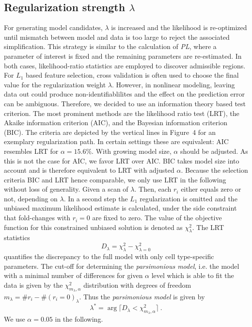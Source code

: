 \documentclass{bioinfo}
\begin{document}
\subsection{Regularization strength $\lambda$}
For generating model candidates, $\lambda$ is increased and the likelihood is re-optimized until mismatch between model and data is too large to reject the associated simplification.
This strategy is similar to the calculation of \emph{PL}, where a parameter of interest is fixed and the remaining parameters are re-estimated.
In both cases, likelihood-ratio statistics are employed to discover admissible regions.
For $L_1$ based feature selection, cross validation is often used to choose the final value for the regularization weight $\lambda$.
However, in nonlinear modeling, leaving data out could produce non-identifiablilites and the effect on the prediction error can be ambiguous.
Therefore, we decided to use an information theory based test criterion.
The most prominent methods are the likelihood ratio test (LRT), the Akaike information criterion (AIC), and the Bayesian information criterion (BIC).
The criteria are depicted by the vertical lines in Figure~4\vphantom{\ref{fig:04}} for an exemplary regularization path.
In certain settings these are equivalent: AIC resembles LRT for $\alpha = 15.6\%$.
With growing model size, $\alpha$ should be adjusted.
As this is not the case for AIC, we favor LRT over AIC.
BIC takes model size into account and is therefore equivalent to LRT with adjusted $\alpha$.
Because the selection criteria BIC and LRT hence comparable, we only use LRT in the following without loss of generality.
Given a scan of $\lambda$.
Then, each $r_i$ either equals zero or not, depending on $\lambda$.
In a second step the $L_1$ regularization is omitted and the unbiased maximum likelihood estimate is calculated, under the side constraint that fold-changes with $r_i=0$ are fixed to zero.
The value of the objective function for this constrained unbiased solution is denoted as $\chi^2_\lambda$.
The LRT statistics
\begin{equation}
	D_\lambda = \chi^2_\lambda - \chi^2_{\lambda=0}
\end{equation}
quantifies the discrepancy to the full model with only cell type-specific parameters.
The cut-off for determining the \emph{parsimonious model}, i.e. the model with a minimal number of differences for given $\alpha$ level which is able to fit the data is given by the $\chi^2_{m_\lambda,\alpha}$ distribution with degrees of freedom $m_\lambda=\#r_i - \#(r_i=0)_\lambda$.
Thus the \emph{parsimonious model} is given by
\begin{equation}
	\lambda^* = \arg \lceil D_\lambda < \chi^2_{m_\lambda,\alpha} \rceil \:.
\end{equation}
We use $\alpha = 0.05$ in the following.
\end{document}
